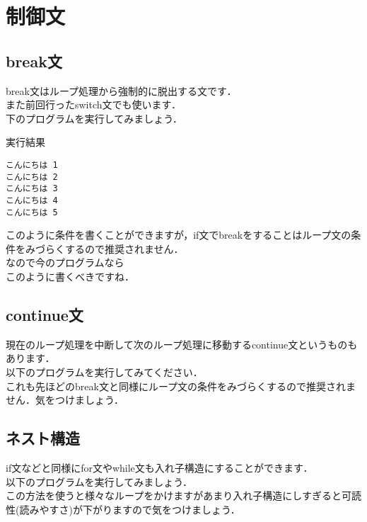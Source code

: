\section{制御文}
\subsection{break文}
break文はループ処理から強制的に脱出する文です．\\
また前回行ったswitch文でも使います．\\
下のプログラムを実行してみましょう．\\

\begin{itembox}[l]{実行結果}
\begin{verbatim}
こんにちは 1
こんにちは 2
こんにちは 3
こんにちは 4
こんにちは 5
\end{verbatim}
\end{itembox}

このように条件を書くことができますが，if文でbreakをすることはループ文の条件をみづらくするので推奨されません．\\
なので今のプログラムなら\\

このように書くべきですね．\\
\subsection{continue文}
現在のループ処理を中断して次のループ処理に移動するcontinue文というものもあります．\\
以下のプログラムを実行してみてください．\\

これも先ほどのbreak文と同様にループ文の条件をみづらくするので推奨されません．気をつけましょう．\\
\subsection{ネスト構造}
if文などと同様にfor文やwhile文も入れ子構造にすることができます．\\
以下のプログラムを実行してみましょう．\\

この方法を使うと様々なループをかけますがあまり入れ子構造にしすぎると可読性(読みやすさ)が下がりますので気をつけましょう．\\

